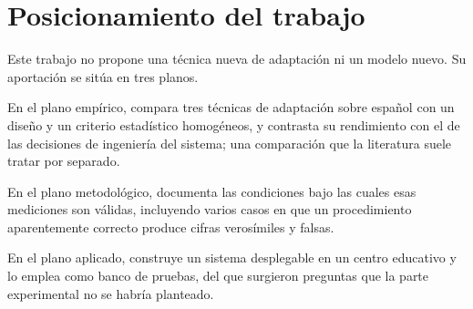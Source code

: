 \section{Posicionamiento del trabajo}

Este trabajo no propone una técnica nueva de adaptación ni un modelo nuevo. Su aportación
se sitúa en tres planos.

En el plano empírico, compara tres técnicas de adaptación sobre español con un diseño y un
criterio estadístico homogéneos, y contrasta su rendimiento con el de las decisiones de
ingeniería del sistema; una comparación que la literatura suele tratar por separado.

En el plano metodológico, documenta las condiciones bajo las cuales esas mediciones son
válidas, incluyendo varios casos en que un procedimiento aparentemente correcto produce
cifras verosímiles y falsas.

En el plano aplicado, construye un sistema desplegable en un centro educativo y lo emplea
como banco de pruebas, del que surgieron preguntas que la parte experimental no se habría
planteado.
